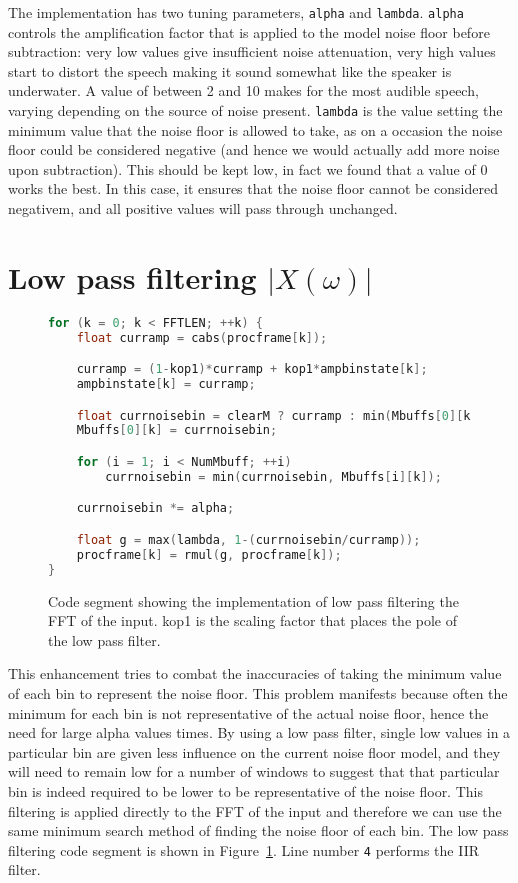 \documentclass[11pt]{article} %
\begin{document}
{The implementation has two tuning parameters, \verb"alpha" and \verb"lambda". \verb"alpha" controls the amplification factor that is applied to the model noise floor before subtraction: very low values give insufficient noise attenuation, very high values start to distort the speech making it sound somewhat like the speaker is underwater. A value of between 2 and 10 makes for the most audible speech, varying depending on the source of noise present. 
\verb"lambda" is the value setting the minimum value that the noise floor is allowed to take, as on a occasion the noise floor could be considered negative (and hence we would actually add more noise upon subtraction). This should be kept low, in fact we found that a value of 0 works the best. In this case, it ensures that the noise floor cannot be considered negativem, and all positive values will pass through unchanged.


\section{Low pass filtering $\lvert X(\omega) \rvert $} 
\label{sec:LPF}
\begin{figure}[htbp]
	\begin{center}
    \begin{lstlisting}[language = C]
for (k = 0; k < FFTLEN; ++k) {
	float curramp = cabs(procframe[k]); 

	curramp = (1-kop1)*curramp + kop1*ampbinstate[k];
	ampbinstate[k] = curramp;

	float currnoisebin = clearM ? curramp : min(Mbuffs[0][k], curramp);
	Mbuffs[0][k] = currnoisebin;

	for (i = 1; i < NumMbuff; ++i)
		currnoisebin = min(currnoisebin, Mbuffs[i][k]);

	currnoisebin *= alpha;

	float g = max(lambda, 1-(currnoisebin/curramp));
	procframe[k] = rmul(g, procframe[k]);
}
    \end{lstlisting}
  \end{center}
	\caption{Code segment showing the implementation of low pass filtering the FFT of the input. kop1 is the scaling factor that places the pole of the low pass filter.}
	\label{code:LPFxOMG}
\end{figure}

This enhancement tries to combat the inaccuracies of taking the minimum value of each bin to represent the noise floor. This problem manifests because often the minimum for each bin is not representative of the actual noise floor, hence the need for large alpha values times. By using a low pass filter, single low values in a particular bin are given less influence on the current noise floor model, and they will need to remain low for a number of windows to suggest that that particular bin is indeed required to be lower to be representative of the noise floor.
This filtering is applied directly to the FFT of the input and therefore we can use the same minimum search method of finding the noise floor of each bin. The low pass filtering code segment is shown in Figure~\ref{code:LPFxOMG}. Line number \verb"4" performs the IIR filter. 

}
\end{document}
